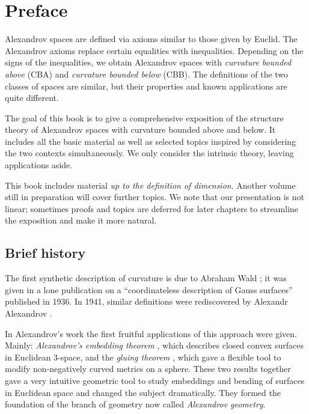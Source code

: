 \chapter*{Preface}

Alexandrov spaces are defined via axioms similar to those given by Euclid.
The Alexandrov axioms replace certain  equalities with inequalities. 
Depending on the signs of the inequalities, we obtain Alexandrov spaces with {}\emph{curvature bounded above} (CBA) and {}\emph{curvature bounded below} (CBB).
The definitions of the two classes of spaces are similar, but their properties and known applications are quite different.

The goal of this book is to give a comprehensive exposition of the structure theory of Alexandrov spaces 
with curvature bounded above and below.
It includes all the basic material as well as selected topics inspired by considering the two contexts simultaneously.
We only consider  the intrinsic theory, leaving applications aside. 

This book includes material \emph{up to the definition of dimension}.
Another volume still in preparation will cover further topics.
We note that our presentation is not linear;
sometimes proofs and topics are deferred for later chapters to streamline the exposition and make it more natural.

\section*{Brief history}

The first synthetic description of curvature is due to Abraham Wald \cite{wald}; 
it was given in a lone publication on a ``coordinateless description of Gauss surfaces'' published in 1936.
In 1941, similar definitions were rediscovered by Alexandr Alexandrov \cite{alexandrov:def}.

In Alexandrov's work the first fruitful applications of this approach were given.
Mainly: {}\emph{Alexandrov's embedding theorem} \cite{alexandrov-1941,alexandrov-1941convex}, which describes closed convex surfaces in Euclidean 3-space,
and the {}\emph{gluing theorem} \cite{alexandrov-1946}, which gave a flexible tool to modify non-negatively curved metrics on a sphere.
These two results together gave  a very intuitive geometric tool to study embeddings and bending of surfaces in Euclidean space and changed the subject dramatically.
They formed the foundation of the branch of geometry now called {}\emph{Alexandrov geometry}.



